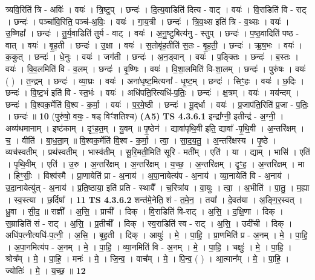\documentclass[17pt]{extarticle}
\begin{document}
                  त्र्यवि॒रिति॑ त्रि - अविः॑ । वयः॑ । त्रि॒ष्टुप् । छन्दः॑ । दि॒त्य॒वाडिति॑ दित्य - वाट् । वयः॑ । वि॒राडिति॑ वि - राट् । छन्दः॑ । पञ्चा॑वि॒रिति॒ पञ्च॑-अ॒विः॒ । वयः॑ । गा॒य॒त्री । छन्दः॑ । त्रि॒व॒थ्स इति॑ त्रि - व॒थ्सः । वयः॑ । उ॒ष्णिहा᳚ । छन्दः॑ । तु॒र्य॒वाडिति॑ तुर्य - वाट् । वयः॑ । अ॒नु॒ष्टुबित्य॑नु - स्तुप् । छन्दः॑ । प॒ष्ठ॒वादिति॑ पष्ठ - वात् । वयः॑ । बृ॒ह॒ती । छन्दः॑ । उ॒क्षा । वयः॑ । स॒तोबृ॑ह॒तीति॑ स॒तः - बृ॒ह॒ती॒ । छन्दः॑ । ऋ॒ष॒भः । वयः॑ । क॒कुत् । छन्दः॑ । धे॒नुः । वयः॑ । जग॑ती । छन्दः॑ । अ॒न॒ड्वान् । वयः॑ । प॒ङ्क्तिः । छन्दः॑ । ब॒स्तः । वयः॑ । वि॒व॒लमिति॑ वि - व॒लम् । छन्दः॑ । वृ॒ष्णिः । वयः॑ । वि॒शा॒लमिति॑ वि-शा॒लम् । छन्दः॑ । पुरु॑षः । वयः॑ ( ) । त॒न्द्रम् । छन्दः॑ । व्या॒घ्रः । वयः॑ । अना॑धृष्ट॒मित्यना᳚ - धृ॒ष्ट॒म् । छन्दः॑ । सिꣳ॒॒हः । वयः॑ । छ॒दिः । छन्दः॑ । वि॒ष्ट॒भं इति॑ वि - स्त॒भंः । वयः॑ । अधि॑पति॒रित्यधि॑-प॒तिः॒ । छन्दः॑ । क्ष॒त्रम् । वयः॑ । मय॑न्दम् । छन्दः॑ । वि॒श्वक॒र्मेति॑ वि॒श्व - क॒र्मा॒ । वयः॑ । प॒र॒मे॒ष्ठी । छन्दः॑ । मू॒द्‌र्धा । वयः॑ । प्र॒जाप॑ति॒रिति॑ प्र॒जा - प॒तिः॒ । छन्दः॑ ॥ \textbf{  10 } \newline
                  \newline
                      (पुरु॑षो॒ वयः॒ - षड् विꣳ॑शतिश्च)  \textbf{(A5)} \newline \newline
                                \textbf{ TS 4.3.6.1} \newline
                  इन्द्रा᳚ग्नी॒ इतीन्द्र॑ - अ॒ग्नी॒ । अव्य॑थमानाम् । इष्ट॑काम् । दृꣳ॒॒ह॒त॒म् । यु॒वम् ॥ पृ॒ष्ठेन॑ । द्यावा॑पृथि॒वी इति॒ द्यावा᳚ -पृ॒थि॒वी । अ॒न्तरि॑क्षम् । च॒ । वीति॑ । बा॒ध॒ता॒म् ॥ वि॒श्वक॒र्मेति॑ वि॒श्व - क॒र्मा॒ । त्वा॒ । सा॒द॒य॒तु॒ । अ॒न्तरि॑क्षस्य । पृ॒ष्ठे । व्यच॑स्वतीम् । प्रथ॑स्वतीम् । भास्व॑तीम् । सू॒रि॒मती॒मिति॑ सूरि - मती᳚म् । एति॑ । या । द्याम् । भासि॑ । एति॑ । पृ॒थि॒वीम् । एति॑ । उ॒रु । अ॒न्तरि॑क्षम् । अ॒न्तरि॑क्षम् । य॒च्छ॒ । अ॒न्तरि॑क्षम् । दृꣳ॒॒ह॒ । अ॒न्तरि॑क्षम् । मा । हिꣳ॒॒सीः॒ । विश्व॑स्मै । प्रा॒णायेति॑ प्रा - अ॒नाय॑ । अ॒पा॒नायेत्य॑प - अ॒नाय॑ । व्या॒नायेति॑ वि - अ॒नाय॑ । उ॒दा॒नायेत्यु॑त् - अ॒नाय॑ । प्र॒ति॒ष्ठाया॒ इति॑ प्रति - स्थायै᳚ । च॒रित्रा॑य । वा॒युः । त्वा॒ । अ॒भीति॑ । पा॒तु॒ । म॒ह्या । स्व॒स्त्या । छ॒र्दिषा᳚ । \textbf{  11} \newline
                  \newline
                                \textbf{ TS 4.3.6.2} \newline
                  शन्त॑मे॒नेति॒ शं - त॒मे॒न॒ । तया᳚ । दे॒वत॑या । अ॒ङ्गि॒र॒स्वत् । ध्रु॒वा । सी॒द॒ ॥ राज्ञी᳚ । अ॒सि॒ । प्राची᳚ । दिक् । वि॒राडिति॑ वि-राट् । अ॒सि॒ । द॒क्षि॒णा । दिक् । स॒म्राडिति॑ सं - राट् । अ॒सि॒ । प्र॒तीची᳚ । दिक् । स्व॒राडिति॑ स्व - राट् । अ॒सि॒ । उदी॑ची । दिक् । अधि॑प॒त्नीत्यधि॑-प॒त्नी॒ । अ॒सि॒ । बृ॒ह॒ती । दिक् । आयुः॑ । मे॒ । पा॒हि॒ । प्रा॒णमिति॑ प्र - अ॒नम् । मे॒ । पा॒हि॒ । अ॒पा॒नमित्य॑प - अ॒नम् । मे॒ । पा॒हि॒ । व्या॒नमिति॑ वि - अ॒नम् । मे॒ । पा॒हि॒ । चक्षुः॑ । मे॒ । पा॒हि॒ । श्रोत्र᳚म् । मे॒ । पा॒हि॒ । मनः॑ । मे॒ । जि॒न्व॒ । वाच᳚म् । मे॒ । पि॒न्व॒ ( ) । आ॒त्मान᳚म् । मे॒ । पा॒हि॒ । ज्योतिः॑ । मे॒ । य॒च्छ॒ ॥ \textbf{  12 } \newline
\end{document}
